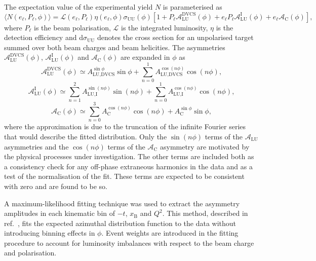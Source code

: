 The expectation value of the experimental yield $N$ is parameterised as
\begin{equation}
 \langle N(e_{\ell},P_{\ell},\phi)\rangle =
\mathcal{L}(e_{\ell},P_{\ell})\eta(e_{\ell},\phi)\sigma_{\textrm{UU}}
(\phi)
[1+P_{\ell}\mathcal{A}_{\textrm{LU}}^{\textrm{DVCS}}(\phi)+e_{\ell}P_{\ell}
\mathcal{A}_{\textrm{LU}}^{\textrm{I}}(\phi)+e_{\ell}\mathcal{A}_{\textrm{C}}
(\phi)],
\end{equation}
where $P_\ell$ is the beam polarisation, $\mathcal{L}$ is the integrated luminosity, $\eta$ is the detection
efficiency and d$\sigma_{\textrm{UU}}$ denotes the
cross section for an unpolarised target summed over both beam charges and
beam helicities. The asymmetries $\mathcal{A}_{\textrm{LU}}^{\textrm{DVCS}}(\phi)$, $\mathcal{A}_{\textrm{LU}}^{\textrm{I}}(\phi)$ and
$\mathcal{A}_{\textrm{C}}(\phi)$ are expanded in
$\phi$ as
\begin{equation}
 \mathcal{A}_{\textrm{LU}}^{\textrm{DVCS}}(\phi) \simeq 
A_{\textrm{LU,DVCS}}^{\sin\phi}\sin\phi 
+ \sum^{1}_{n=0} A_{\textrm{LU,DVCS}}^{\cos(n\phi)}\cos(n\phi), 
\label{aludvcs_asym}
\end{equation}
\begin{equation}
\mathcal{A}_{\textrm{LU}}^{\textrm{I}}(\phi) \simeq \sum^{2}_{n=1}
A_{\textrm{LU,I}}^{\sin(n\phi)}\sin(n\phi) 
+ \sum^{1}_{n=0} A_{\textrm{LU,I}}^{\cos(n\phi)}\cos(n\phi), 
\label{alui_asym}
\end{equation}
\begin{equation}
\mathcal{A}_{\textrm{C}}(\phi) \simeq \sum^{3}_{n=0}
A_{\textrm{C}}^{\cos(n\phi)}\cos(n\phi) 
+ A_{\textrm{C}}^{\sin\phi}\sin\phi,
\label{ac_asym}
\end{equation}
where the approximation is due to the truncation of the infinite
Fourier series that would describe  the fitted distribution. Only the $\sin(n\phi)$ terms of the
$\mathcal{A}_{\textrm{LU}}$ asymmetries and the $\cos(n\phi)$ terms of the
$\mathcal{A}_{\textrm{C}}$ asymmetry are motivated by the
  physical processes under investigation. The other terms
are included both as a consistency check for any off-phase
extraneous harmonics in the data and as a test of the
normalisation of the fit. These terms are expected to be
consistent with zero and are found to be so.

A maximum-likelihood fitting technique \cite{Bar90} was used to
extract the asymmetry amplitudes in each kinematic bin of $-t$, $x_{\textrm{B}}$ and $Q^{2}$.
This method, described in ref.~\cite{Air08}, fits the expected
azimuthal distribution function to the data without introducing binning effects in $\phi$.
Event weights are introduced in the fitting procedure to account for
luminosity imbalances with respect to the beam charge and polarisation.

